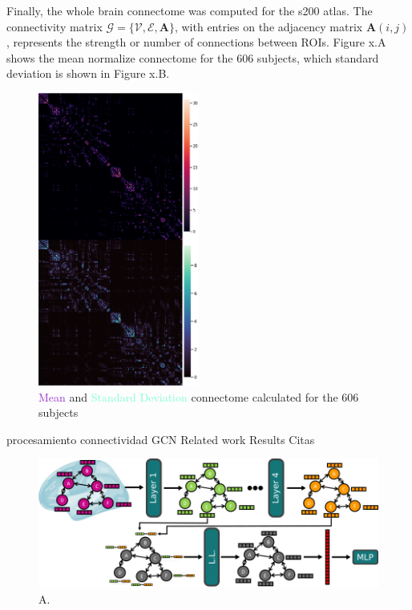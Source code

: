 \documentclass{cys}
\begin{document}
Finally, the whole brain connectome was computed for the s200 atlas. The connectivity matrix $\mathcal{G}=\{\mathcal{V},\mathcal{E},\mathbf{A}\}$, with entries on the adjacency matrix $\mathbf{A}(i,j)$, represents the strength or number of connections between ROIs. Figure x.A shows the mean normalize connectome for the 606 subjects, which standard deviation is shown in Figure x.B. 

\begin{figure}[H]
\centering
	\includegraphics[width=0.47\textwidth]{SCs200}
	\caption{\textcolor{DarkOrchid}{Mean} and \textcolor{Aquamarine}{Standard Deviation} connectome calculated for the 606 subjects}
	\label{FullBrainTractography}
\end{figure}

procesamiento connectividad
GCN
Related work
Results 
Citas

\begin{figure}[ht]
\centering
	\includegraphics[width=1\textwidth]{GCN}
	\caption{A. }
	\label{CSD}
\end{figure}
\end{document}
